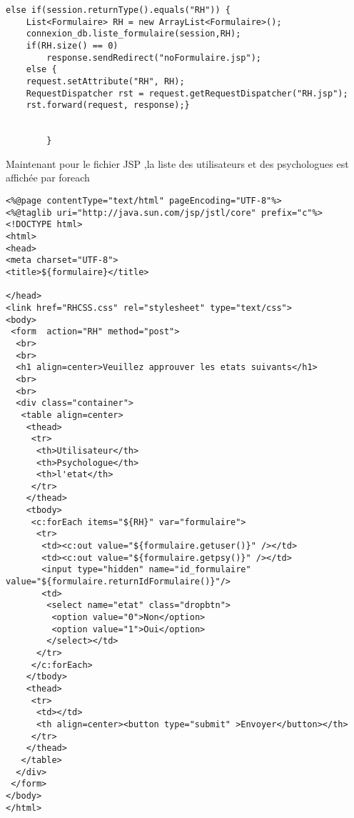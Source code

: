 \documentclass[12]{article}
\begin{document}
\lstset{language=java}
\begin{lstlisting}
else if(session.returnType().equals("RH")) {
	List<Formulaire> RH = new ArrayList<Formulaire>();
	connexion_db.liste_formulaire(session,RH);
	if(RH.size() == 0)
		response.sendRedirect("noFormulaire.jsp");
	else {
	request.setAttribute("RH", RH);
	RequestDispatcher rst = request.getRequestDispatcher("RH.jsp");
	rst.forward(request, response);}
		  
			
		}
\end{lstlisting}
 Maintenant pour le fichier JSP ,la liste des utilisateurs et des psychologues est affichée par foreach
\lstset{language=java}
\begin{lstlisting}
<%@page contentType="text/html" pageEncoding="UTF-8"%>
<%@taglib uri="http://java.sun.com/jsp/jstl/core" prefix="c"%>
<!DOCTYPE html>
<html>
<head>
<meta charset="UTF-8">
<title>${formulaire}</title>

</head>
<link href="RHCSS.css" rel="stylesheet" type="text/css">
<body>
 <form  action="RH" method="post">
  <br>
  <br>
  <h1 align=center>Veuillez approuver les etats suivants</h1>
  <br>
  <br>
  <div class="container">
   <table align=center>
    <thead>
     <tr>
      <th>Utilisateur</th>
      <th>Psychologue</th>
      <th>l'etat</th>
     </tr>
    </thead>
    <tbody>
     <c:forEach items="${RH}" var="formulaire">
      <tr>
       <td><c:out value="${formulaire.getuser()}" /></td>
       <td><c:out value="${formulaire.getpsy()}" /></td>
       <input type="hidden" name="id_formulaire" value="${formulaire.returnIdFormulaire()}"/>
       <td>
        <select name="etat" class="dropbtn">
         <option value="0">Non</option>
         <option value="1">Oui</option>
        </select></td>
      </tr>
     </c:forEach>
    </tbody>
    <thead>
     <tr>
      <td></td>
      <th align=center><button type="submit" >Envoyer</button></th>
     </tr>
    </thead>
   </table>
  </div>
 </form>
</body>
</html>

\end{lstlisting}
 
\end{document}
